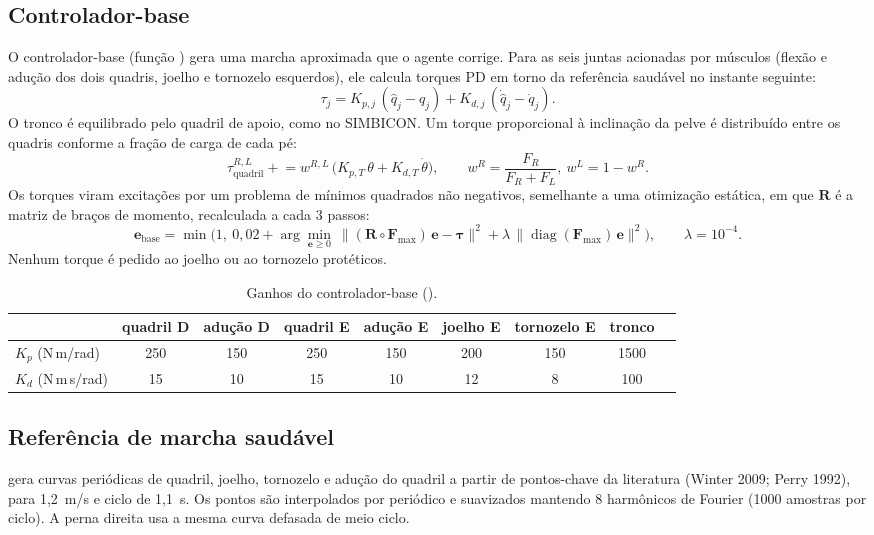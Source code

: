 \documentclass[11pt,a4paper]{article}
\begin{document}
\subsection{Controlador-base}
O controlador-base (função ) gera uma marcha aproximada que o agente corrige. Para as seis
juntas acionadas por músculos (flexão e adução dos dois quadris, joelho e tornozelo esquerdos), ele calcula
torques PD em torno da referência saudável no instante seguinte:
\begin{equation}
\tau_j = K_{p,j}\,(\hat q_j - q_j) + K_{d,j}\,(\dot{\hat q}_j - \dot q_j).
\end{equation}
O tronco é equilibrado pelo quadril de apoio, como no SIMBICON. Um torque proporcional à inclinação da
pelve é distribuído entre os quadris conforme a fração de carga de cada pé:
\begin{equation}
\tau_{\mathrm{quadril}}^{R,L} \mathrel{+}= w^{R,L}\,\big(K_{p,T}\,\theta + K_{d,T}\,\dot\theta\big),\qquad
w^{R} = \frac{F_R}{F_R+F_L},\ w^{L}=1-w^{R}.
\end{equation}
Os torques viram excitações por um problema de mínimos quadrados não negativos, semelhante a uma
otimização estática, em que $\mathbf R$ é a matriz de braços de momento, recalculada a cada 3 passos:
\begin{equation}
\mathbf e_{\mathrm{base}} = \min\!\Big(1,\ 0{,}02 + \arg\min_{\mathbf e\ge 0}\ \big\|(\mathbf R\circ \mathbf F_{\max})\,\mathbf e-\boldsymbol\tau\big\|^2
+ \lambda\,\|\operatorname{diag}(\mathbf F_{\max})\,\mathbf e\|^2\Big),\qquad \lambda=10^{-4}.
\end{equation}
Nenhum torque é pedido ao joelho ou ao tornozelo protéticos.

\begin{table}[H]
\centering\small
\caption{Ganhos do controlador-base (\protect{}).}
\begin{tabular}{@{}lcccccc|cc@{}}
\toprule
 & quadril D & adução D & quadril E & adução E & joelho E & tornozelo E & tronco \\ \midrule
$K_p$ (N\,m/rad) & 250 & 150 & 250 & 150 & 200 & 150 & 1500 \\
$K_d$ (N\,m\,s/rad) & 15 & 10 & 15 & 10 & 12 & 8 & 100 \\
\bottomrule
\end{tabular}
\end{table}

\subsection{Referência de marcha saudável}
 gera curvas periódicas de quadril, joelho, tornozelo e adução do quadril a
partir de pontos-chave da literatura (Winter 2009; Perry 1992), para 1{,}2~m/s e ciclo de 1{,}1~s. Os pontos
são interpolados por  periódico e suavizados mantendo 8 harmônicos de Fourier (1000 amostras por
ciclo). A perna direita usa a mesma curva defasada de meio ciclo.
\end{document}
